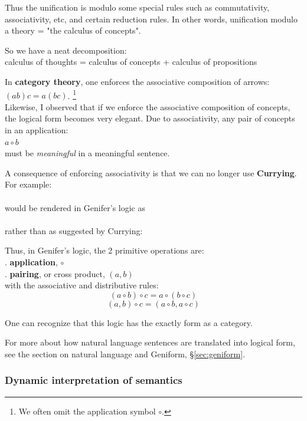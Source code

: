 Thus the unification is modulo some special rules such as commutativity, associativity, etc, and certain reduction rules.  In other words, unification modulo a theory = "the calculus of concepts".

So we have a neat decomposition:\\
\tab calculus of thoughts = calculus of concepts + calculus of propositions

In \textbf{category theory}, one enforces the associative composition of arrows:\\
\tab $(ab)c = a(bc)$. \footnote{We often omit the application symbol $\circ$.}\\
Likewise, I observed that if we enforce the associative composition of concepts, the logical form becomes very elegant.  Due to associativity, any pair of concepts in an application:\\
\tab $a \circ b$\\
must be \textit{meaningful} in a meaningful sentence.

A consequence of enforcing associativity is that we can no longer use \textbf{Currying}.  For example:\\
\tab {}\\
would be rendered in Genifer's logic as\\
\tab {}\\
rather than as suggested by Currying:\\
\tab {}

Thus, in Genifer's logic, the 2 primitive operations are:\\
. \textbf{application}, $\circ$\\
. \textbf{pairing}, or cross product, $(a,b)$\\
with the associative and distributive rules:
$$ (a \circ b) \circ c = a \circ (b \circ c) $$
$$ (a, b) \circ c = (a \circ b, a \circ c)$$

One can recognize that this logic has the exactly form as a category.  

For more about how natural language sentences are translated into logical form, see the section on natural language and Geniform, \S\ref{sec:geniform}.

\subsubsection{Dynamic interpretation of semantics}

